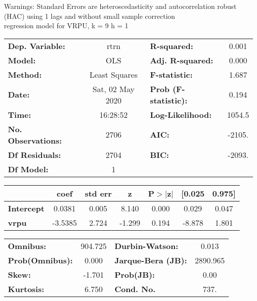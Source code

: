 Warnings: \newline
 [1] Standard Errors are heteroscedasticity and autocorrelation robust (HAC) using 1 lags and without small sample correction\\ 

regression model for VRPU, k = 9 h = 1\begin{center}
\begin{tabular}{lclc}
\toprule
\textbf{Dep. Variable:}    &       rtrn       & \textbf{  R-squared:         } &     0.001   \\
\textbf{Model:}            &       OLS        & \textbf{  Adj. R-squared:    } &     0.000   \\
\textbf{Method:}           &  Least Squares   & \textbf{  F-statistic:       } &     1.687   \\
\textbf{Date:}             & Sat, 02 May 2020 & \textbf{  Prob (F-statistic):} &    0.194    \\
\textbf{Time:}             &     16:28:52     & \textbf{  Log-Likelihood:    } &    1054.5   \\
\textbf{No. Observations:} &        2706      & \textbf{  AIC:               } &    -2105.   \\
\textbf{Df Residuals:}     &        2704      & \textbf{  BIC:               } &    -2093.   \\
\textbf{Df Model:}         &           1      & \textbf{                     } &             \\
\bottomrule
\end{tabular}
\begin{tabular}{lcccccc}
                   & \textbf{coef} & \textbf{std err} & \textbf{z} & \textbf{P$> |$z$|$} & \textbf{[0.025} & \textbf{0.975]}  \\
\midrule
\textbf{Intercept} &       0.0381  &        0.005     &     8.140  &         0.000        &        0.029    &        0.047     \\
\textbf{vrpu}      &      -3.5385  &        2.724     &    -1.299  &         0.194        &       -8.878    &        1.801     \\
\bottomrule
\end{tabular}
\begin{tabular}{lclc}
\textbf{Omnibus:}       & 904.725 & \textbf{  Durbin-Watson:     } &    0.013  \\
\textbf{Prob(Omnibus):} &   0.000 & \textbf{  Jarque-Bera (JB):  } & 2890.965  \\
\textbf{Skew:}          &  -1.701 & \textbf{  Prob(JB):          } &     0.00  \\
\textbf{Kurtosis:}      &   6.750 & \textbf{  Cond. No.          } &     737.  \\
\bottomrule
\end{tabular}
\end{center}


